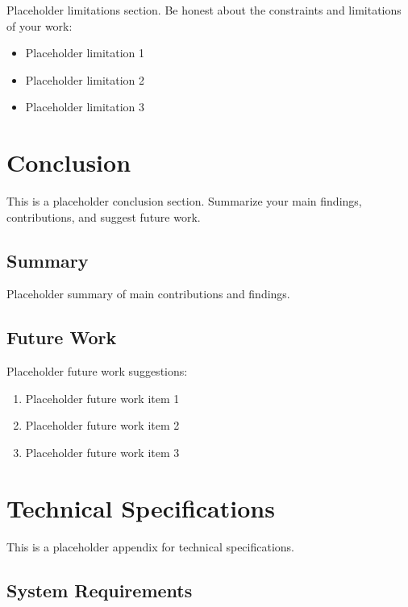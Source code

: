 Placeholder limitations section. Be honest about the constraints and limitations of your work:

\begin{itemize}
\item Placeholder limitation 1
\item Placeholder limitation 2
\item Placeholder limitation 3
\end{itemize}

\section{Conclusion}\label{sec:conclusion}

This is a placeholder conclusion section. Summarize your main findings, contributions, and suggest future work.

\subsection{Summary}\label{subsec:summary}

Placeholder summary of main contributions and findings.

\subsection{Future Work}\label{subsec:future-work}

Placeholder future work suggestions:

\begin{enumerate}
\item Placeholder future work item 1
\item Placeholder future work item 2
\item Placeholder future work item 3
\end{enumerate}


\appendix

\section{Technical Specifications}\label{app:technical-specs}

This is a placeholder appendix for technical specifications.

\subsection{System Requirements}\label{app:system-requirements}

